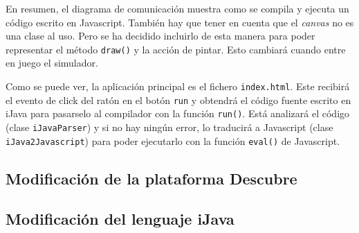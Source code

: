 En resumen, el diagrama de comunicación muestra como se compila y ejecuta un código escrito en Javascript. También hay que tener en cuenta que el \emph{canvas} no es una clase al uso. Pero se ha decidido incluirlo de esta manera para poder representar el método \texttt{draw()} y la acción de pintar. Esto cambiará cuando entre en juego el simulador.

Como se puede ver, la aplicación principal es el fichero \texttt{index.html}. Este recibirá el evento de click del ratón en el botón \texttt{run} y obtendrá el código fuente escrito en iJava para pasarselo al compilador con la función \texttt{run()}. Está analizará el código (clase \texttt{iJavaParser}) y si no hay ningún error, lo traducirá a Javascript (clase \texttt{iJava2Javascript}) para poder ejecutarlo con la función \texttt{eval()} de Javascript.


\subsection{Modificación de la plataforma Descubre}
\label{sec:modificacion-descubre}


\subsection{Modificación del lenguaje iJava}
\label{sec:modificacion-ijava}



